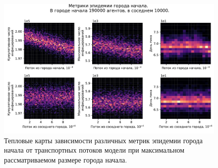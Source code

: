\documentclass[a4paper,12pt]{article} %
\begin{document}

\begin{figure}[H]
    \centering
    \includegraphics[width=0.9\linewidth]{images/bignsmall_190000_0.pdf}
    \caption{Тепловые карты зависимости различных метрик эпидемии города начала от транспортных потоков модели при максимальном рассматриваемом размере города начала.}
    \label{pic:bignsmall_190000_0}
\end{figure}
\end{document}
